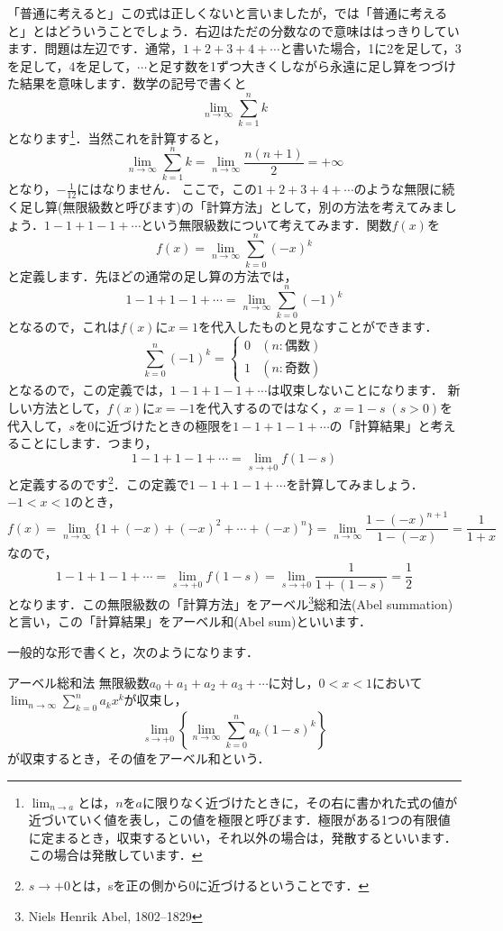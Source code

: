 \documentclass[./main]{subfile}
\begin{document}
「普通に考えると」この式は正しくないと言いましたが，では「普通に考えると」とはどういうことでしょう．右辺はただの分数なので意味ははっきりしています．問題は左辺です．通常，$1+2+3+4+\cdots$と書いた場合，1に2を足して，3を足して，4を足して，$\cdots$と足す数を1ずつ大きくしながら永遠に足し算をつづけた結果を意味します．数学の記号で書くと
\[
\lim_{n\to\infty}\sum_{k=1}^{n}k
\]
となります\footnote{$\lim_{n\to a}$とは，$n$を$a$に限りなく近づけたときに，その右に書かれた式の値が近づいていく値を表し，この値を極限と呼びます．極限がある1つの有限値に定まるとき，収束するといい，それ以外の場合は，発散するといいます．この場合は発散しています．}．当然これを計算すると，
\[
\lim_{n\to\infty}\sum_{k=1}^{n}k=\lim_{n\to\infty}\frac{n(n+1)}{2}=+\infty
\]
となり，$-\frac{1}{12}$にはなりません．
ここで，この$1+2+3+4+\cdots$のような無限に続く足し算(無限級数と呼びます)の「計算方法」として，別の方法を考えてみましょう．$1-1+1-1+\cdots$という無限級数について考えてみます．関数$f(x)$を
\[
f(x)=\lim_{n\to\infty}\sum_{k=0}^{n}(-x)^{k}
\]
と定義します．先ほどの通常の足し算の方法では，
\[
1-1+1-1+\cdots=\lim_{n\to\infty}\sum_{k=0}^{n}(-1)^{k}
\]
となるので，これは$f(x)$に$x=1$を代入したものと見なすことができます．
\[
\sum_{k=0}^{n}(-1)^{k}=
\begin{cases}
0&(n:\text{偶数})\\
1&(n:\text{奇数})
\end{cases}
\]
となるので，この定義では，$1-1+1-1+\cdots$は収束しないことになります．
新しい方法として，$f(x)$に$x=-1$を代入するのではなく，$x=1-s\;(s>0)$を代入して，$s$を0に近づけたときの極限を$1-1+1-1+\cdots$の「計算結果」と考えることにします．つまり，
\[
1-1+1-1+\cdots=\lim_{s\to +0}f(1-s)
\]
と定義するのです\footnote{$s\to +0$とは，sを正の側から0に近づけるということです．}．この定義で$1-1+1-1+\cdots$を計算してみましょう．$-1<x<1$のとき，
\[
f(x)=\lim_{n\to\infty}\{1+(-x)+(-x)^2+\cdots+(-x)^n\}=\lim_{n\to\infty}\frac{1-(-x)^{n+1}}{1-(-x)}=\frac{1}{1+x}
\]
なので，
\[
1-1+1-1+\cdots=\lim_{s\to +0}f(1-s)=\lim_{s\to +0}\frac{1}{1+(1-s)}=\frac{1}{2}
\]
となります．この無限級数の「計算方法」をアーベル\footnote{Niels Henrik Abel, 1802--1829}総和法(Abel summation)と言い，この「計算結果」をアーベル和(Abel sum)といいます．

一般的な形で書くと，次のようになります．
\begin{itembox}[l]{アーベル総和法}
無限級数$a_0+a_1+a_2+a_3+\cdots$に対し，$0<x<1$において$\lim_{n\to\infty}\sum_{k=0}^na_kx^k$が収束し\footnotemark{}，
\[
\lim_{s\to+0}\left\{\lim_{n\to\infty}\sum_{k=0}^na_k(1-s)^k\right\}
\]
が収束するとき，その値をアーベル和という．
\end{itembox}
\addtocounter{footnote}{-1}
\end{document}
